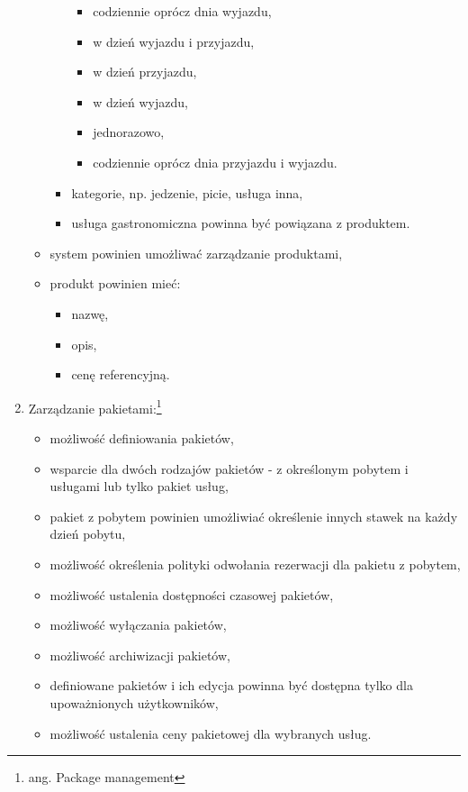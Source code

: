 \documentclass[a4paper,onecolumn,oneside,11pt,wide,floatssmall]{mwrep}
\theoremstyle{definition}
\theoremstyle{plain}%
\theoremstyle{remark}
\begin{document}
\begin{enumerate}
\begin{itemize}
\begin{itemize}
\begin{itemize}
              \item codziennie oprócz dnia wyjazdu,
              \item w dzień wyjazdu i przyjazdu,
              \item w dzień przyjazdu,
              \item w dzień wyjazdu,
              \item jednorazowo,
              \item codziennie oprócz dnia przyjazdu i wyjazdu.
            \end{itemize}
          \item kategorie, np. jedzenie, picie, usługa inna,
          \item usługa gastronomiczna powinna być powiązana z produktem.
        \end{itemize}
        \item system powinien umożliwać zarządzanie produktami,
        \item produkt powinien mieć:
          \begin{itemize}
            \item nazwę,
            \item opis,
            \item cenę referencyjną.
          \end{itemize}
    \end{itemize}
  \item Zarządzanie pakietami:\footnote{ang. Package management}
    \begin{itemize}
      \item możliwość definiowania pakietów,
      \item wsparcie dla dwóch rodzajów pakietów - z określonym pobytem i usługami lub tylko pakiet usług,
      \item pakiet z pobytem powinien umożliwiać określenie innych stawek na każdy dzień pobytu,
      \item możliwość określenia polityki odwołania rezerwacji dla pakietu z pobytem,
      \item możliwość ustalenia dostępności czasowej pakietów,
      \item możliwość wyłączania pakietów,
      \item możliwość archiwizacji pakietów,
      \item definiowane pakietów i ich edycja powinna być dostępna tylko dla upoważnionych użytkowników,
      \item możliwość ustalenia ceny pakietowej dla wybranych usług.

\end{itemize}
\end{enumerate}
\end{document}
